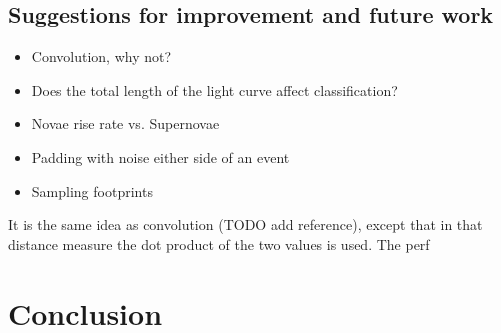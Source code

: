\documentclass[10pt]{article}
\begin{document}
	\subsection{Suggestions for improvement and future work}
		\begin{itemize}
			\item Convolution, why not?
			\item Does the total length of the light curve affect classification?
			\item Novae rise rate vs. Supernovae
			\item Padding with noise either side of an event	 
			\item Sampling footprints
		\end{itemize}
	 It is the same idea as convolution (TODO add reference), except that in that distance measure the dot product of the two values is used. The perf
	
	\section{Conclusion}
	
	
\end{document}
